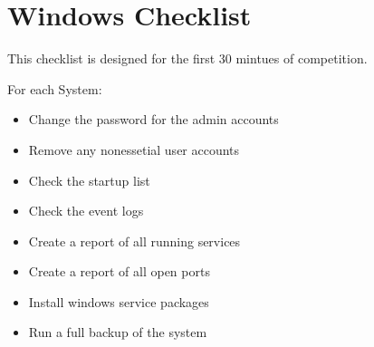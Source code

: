 \section{Windows Checklist}
This checklist is designed for the first 30 mintues of competition.

For each System:
\begin{itemize}
	\item Change the password for the admin accounts
	\item Remove any nonessetial user accounts
	\item Check the startup list
	\item Check the event logs
	\item Create a report of all running services
	\item Create a report of all open ports
	\item Install windows service packages
	\item Run a full backup of the system
\end{itemize}
